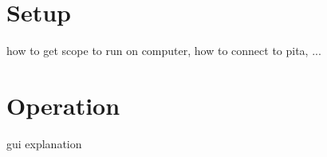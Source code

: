 \chapter{Setup} %
\label{ch:userguide:setup}
how to get scope to run on computer, how to connect to pita, ...
\chapter{Operation} %
\label{ch:userguide:operation}
gui explanation

